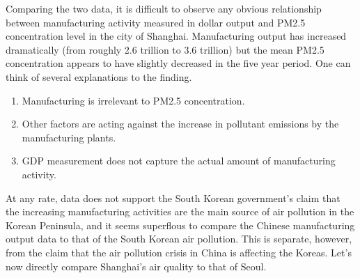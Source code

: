 \documentclass[11pt]{article}
\providecommand{\tightlist}{%
      \setlength{\itemsep}{0pt}\setlength{\parskip}{0pt}}
\begin{document}
    Comparing the two data, it is difficult to observe any obvious
relationship between manufacturing activity measured in dollar output
and PM2.5 concentration level in the city of Shanghai. Manufacturing
output has increased dramatically (from roughly 2.6 trillion to 3.6
trillion) but the mean PM2.5 concentration appears to have slightly
decreased in the five year period. One can think of several explanations
to the finding.

\begin{enumerate}
\def\labelenumi{\arabic{enumi}.}
\tightlist
\item
  Manufacturing is irrelevant to PM2.5 concentration.
\item
  Other factors are acting against the increase in pollutant emissions
  by the manufacturing plants.
\item
  GDP measurement does not capture the actual amount of manufacturing
  activity.
\end{enumerate}

At any rate, data does not support the South Korean government's claim
that the increasing manufacturing activities are the main source of air
pollution in the Korean Peninsula, and it seems superflous to compare
the Chinese manufacturing output data to that of the South Korean air
pollution. This is separate, however, from the claim that the air
pollution crisis in China is affecting the Koreas. Let's now directly
compare Shanghai's air quality to that of Seoul.
\end{document}
